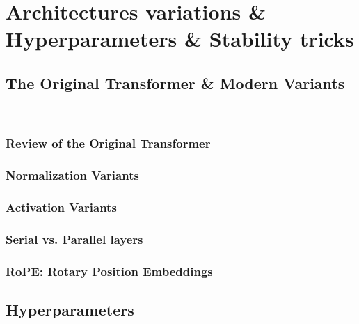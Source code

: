 
\vspace{-10cm}
\chapter{Architectures variations \& Hyperparameters \& Stability tricks}

\vspace{-2cm}


{\chaptoc\noindent\begin{minipage}[inner sep=0,outer sep=0]{0.9\linewidth}\section{The Original Transformer \& Modern Variants}\end{minipage}}
\\

\subsection{Review of the Original Transformer}

\subsection{Normalization Variants}

\subsection{Activation Variants}

\subsection{Serial vs. Parallel layers}

\subsection{RoPE: Rotary Position Embeddings}




\clearpage
{\chaptoc\noindent\begin{minipage}[inner sep=0,outer sep=0]{0.9\linewidth}\section{Hyperparameters}\end{minipage}}
\\

